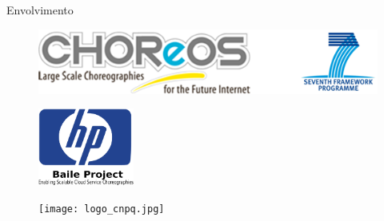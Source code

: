 \documentclass[xcolor=svgnames]{beamer}
\begin{document}






    \begin{frame}{Envolvimento}
      	\begin{figure}[!h]
	    \centering
	    \includegraphics[scale=0.6]{CHOReOSProject.png}
	\end{figure}

	\begin{figure}[!h]
	    \centering
	    \includegraphics[width=0.28\textwidth]{hp_logo_2.png}
	\end{figure}
	
	\begin{figure}[!h]
	    \centering
	    \texttt{[image: logo\_cnpq.jpg]}
	\end{figure}
	
    \end{frame}

 \begin{frame}
 \end{frame}
\end{document}
